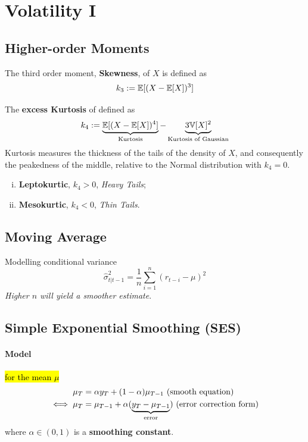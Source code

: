 \documentclass[11pt]{article}
\begin{document}
	\section{Volatility I}
		\subsection{Higher-order Moments}
			\begin{definition}
				The third order moment, \textbf{Skewness}, of $X$ is defined as 
				\begin{equation}
					k_3 := \mathbb{E}[{(X - \mathbb{E}[{X}])^3}]
				\end{equation}
			\end{definition}
			
			\begin{definition}
				The \textbf{excess Kurtosis} of defined as
				\begin{equation}
					k_4 := \underbrace{\mathbb{E}[{(X - \mathbb{E}[{X}])^4}]}_{\text{{Kurtosis}}} - \underbrace{3 \mathbb{V}[{X}]^2}_{\text{{Kurtosis of Gaussian}}}
				\end{equation}
				Kurtosis measures the thickness of the tails of the density of $X$, and consequently the peakedness of the middle, relative to the Normal distribution with $k_4 = 0$.
				\begin{enumerate}[(i)]
					\item \textbf{Leptokurtic}, $k_4 > 0$, \emph{Heavy Tails};
					\item \textbf{Mesokurtic}, $k_4 < 0$, \emph{Thin Tails}.
				\end{enumerate}
			\end{definition}
		
		\subsection{Moving Average}
			\begin{definition}
				Modelling conditional variance
				\begin{equation}
					\hat{\sigma}^2_{t|t-1} = \frac{1}{n} \sum_{i=1}^n (r_{t-i} - \mu)^2
				\end{equation}
				\emph{Higher $n$ will yield a smoother estimate}.
			\end{definition}
		
		\subsection{Simple Exponential Smoothing (SES)}
			\paragraph{Model} \hl{for the mean $\mu$}
				\begin{align}
					\mu_T &= \alpha y_T + (1 - \alpha)\mu_{T-1} \text{{ (smooth equation)}} \\
					\iff \mu_T &= \mu_{T-1} + \alpha (\underbrace{y_T - \mu_{T-1}}_{\text{{error}}}) \text{{ (error correction form)}}
				\end{align}
				where $\alpha \in (0, 1)$ is a \textbf{smoothing constant}.
				
\end{document}
